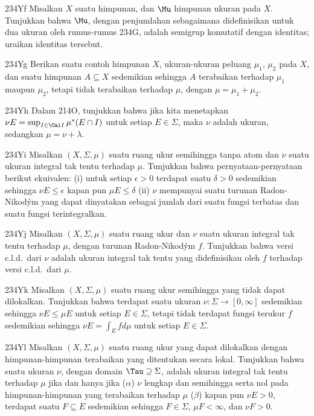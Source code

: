 {\spheader 234Yf
Misalkan $X$ suatu himpunan, dan $\Mu$ himpunan ukuran pada $X$.
Tunjukkan bahwa $\Mu$, dengan penjumlahan sebagaimana didefinisikan untuk
dua ukuran oleh rumus-rumus 234G, adalah semigrup komutatif dengan
identitas; uraikan identitas tersebut.

\spheader 234Yg
Berikan suatu contoh himpunan $X$, ukuran-ukuran peluang
$\mu_1$, $\mu_2$ pada $X$, dan suatu himpunan $A\subseteq X$ sedemikian
sehingga $A$ terabaikan terhadap $\mu_1$ maupun $\mu_2$, tetapi tidak
terabaikan terhadap $\mu$, dengan $\mu=\mu_1+\mu_2$.

\spheader 234Yh
Dalam 214O, tunjukkan bahwa jika kita menetapkan
$\nu E=\sup_{I\in\Cal I}\mu^*(E\cap I)$ untuk setiap $E\in\Sigma$, maka
$\nu$ adalah ukuran, sedangkan $\mu=\nu+\lambda$.

\spheader 234Yi
 Misalkan $(X,\Sigma,\mu)$ suatu ruang ukur semihingga tanpa atom dan
$\nu$ suatu ukuran integral tak tentu terhadap $\mu$. Tunjukkan bahwa
pernyataan-pernyataan berikut ekuivalen: (i) untuk setiap $\epsilon>0$
terdapat suatu $\delta>0$ sedemikian sehingga $\nu E\le\epsilon$ kapan
pun $\mu E\le\delta$ (ii) $\nu$ mempunyai suatu turunan Radon-Nikod\'ym
yang dapat dinyatakan sebagai jumlah dari suatu fungsi terbatas dan suatu
fungsi terintegralkan.

\spheader 234Yj
 Misalkan $(X,\Sigma,\mu)$ suatu ruang ukur dan $\nu$ suatu ukuran
integral tak tentu terhadap $\mu$, dengan turunan Radon-Nikod\'ym $f$.
Tunjukkan bahwa versi c.l.d.\ dari $\nu$ adalah ukuran integral tak tentu
yang didefinisikan oleh $f$ terhadap versi c.l.d.\ dari $\mu$.

\spheader 234Yk
Misalkan $(X,\Sigma,\mu)$ suatu ruang ukur semihingga yang tidak dapat
dilokalkan. Tunjukkan bahwa terdapat suatu ukuran
$\nu:\Sigma\to[0,\infty]$ sedemikian sehingga $\nu E\le\mu E$ untuk
setiap $E\in\Sigma$, tetapi tidak terdapat fungsi terukur $f$ sedemikian
sehingga $\nu E=\int_Efd\mu$ untuk setiap $E\in\Sigma$.

\spheader 234Yl
Misalkan $(X,\Sigma,\mu)$ suatu ruang ukur yang dapat dilokalkan dengan
himpunan-himpunan terabaikan yang ditentukan secara lokal. Tunjukkan
bahwa suatu ukuran $\nu$, dengan domain $\Tau\supseteq\Sigma$, adalah
ukuran integral tak tentu terhadap $\mu$ jika dan hanya jika
($\alpha$) $\nu$ lengkap dan semihingga serta nol pada
himpunan-himpunan yang terabaikan terhadap $\mu$
($\beta$) kapan pun $\nu E>0$, terdapat suatu $F\subseteq E$ sedemikian
sehingga $F\in\Sigma$, $\mu F<\infty$, dan $\nu F>0$.

}
